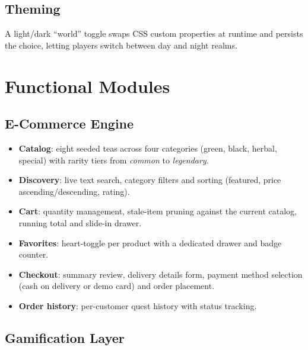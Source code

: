 \documentclass[11pt,a4paper]{article}
\begin{document}
\subsection{Theming}

A light/dark ``world'' toggle swaps CSS custom properties at runtime and
persists the choice, letting players switch between day and night realms.


\section{Functional Modules}

\subsection{E-Commerce Engine}

\begin{itemize}[nosep]
    \item \textbf{Catalog}: eight seeded teas across four categories
          (green, black, herbal, special) with rarity tiers from
          \emph{common} to \emph{legendary}.
    \item \textbf{Discovery}: live text search, category filters and
          sorting (featured, price ascending/descending, rating).
    \item \textbf{Cart}: quantity management, stale-item pruning against
          the current catalog, running total and slide-in drawer.
    \item \textbf{Favorites}: heart-toggle per product with a dedicated
          drawer and badge counter.
    \item \textbf{Checkout}: summary review, delivery details form,
          payment method selection (cash on delivery or demo card) and
          order placement.
    \item \textbf{Order history}: per-customer quest history with status
          tracking.
\end{itemize}

\subsection{Gamification Layer}
\end{document}
